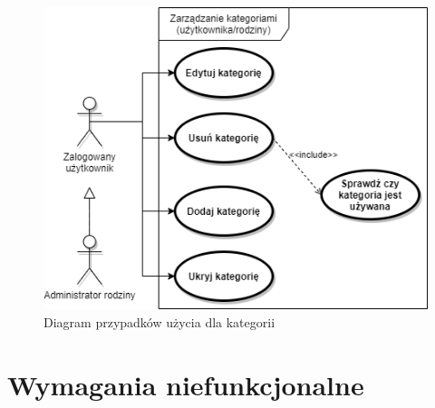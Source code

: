 \begin{figure}[t]
	\centering
	\includegraphics[width=.65\linewidth]{rys03/use-case-category.png}
	\caption{Diagram przypadków użycia dla kategorii}
	\label{fig:use-case-category}
\end{figure}

\section{Wymagania niefunkcjonalne}
\label{sec:wymagania-niefunkcjonalne}

